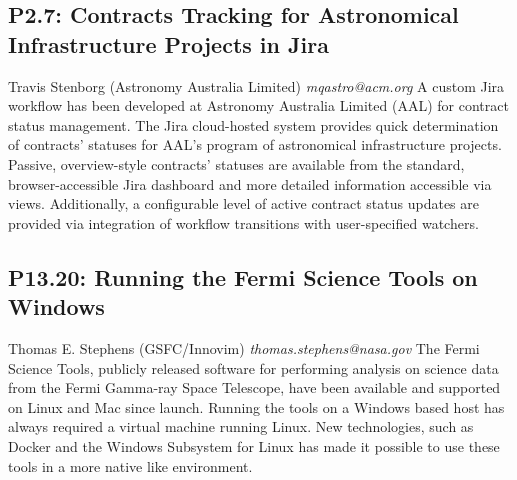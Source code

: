 \documentclass{report}
\begin{document}
\subsection*{P2.7: Contracts Tracking for Astronomical Infrastructure Projects in Jira}
\bigskip
Travis Stenborg (Astronomy Australia Limited) \newline   \newline   \newline   \newline  \newline  \newline\newline
{\it mqastro@acm.org}\newline
\newline\newline
A custom Jira workflow has been developed at Astronomy Australia Limited (AAL) for contract status management. The Jira cloud-hosted system provides quick determination of contracts' statuses for AAL's program of astronomical infrastructure projects. Passive, overview-style contracts' statuses are available from the standard, browser-accessible Jira dashboard and more detailed information accessible via views. Additionally, a configurable level of active contract status updates are provided via integration of workflow transitions with user-specified watchers.\newline
\newpage
\subsection*{P13.20: Running the Fermi Science Tools on Windows}
\bigskip
Thomas E. Stephens (GSFC/Innovim) \newline   \newline   \newline   \newline  \newline  \newline\newline
{\it thomas.stephens@nasa.gov}\newline
\newline\newline
The Fermi Science Tools, publicly released software for performing analysis on science data from the Fermi Gamma-ray Space Telescope, have been available and supported on Linux and Mac since launch.  Running the tools on a Windows based host has always required a virtual machine running Linux.  New technologies, such as Docker and the Windows Subsystem for Linux has made it possible to use these tools in a more native like environment.
\end{document}
